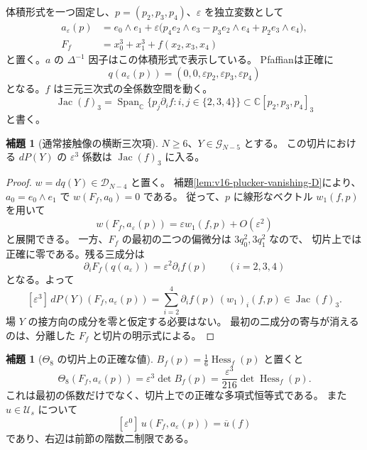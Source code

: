 \documentclass[a4paper,11pt]{ltjsarticle}
\theoremstyle{definition}
\newtheorem{lemma}[theorem]{補題}
\begin{document}
体積形式を一つ固定し、$p=(p_2,p_3,p_4)$、$\varepsilon$ を独立変数として
\begin{equation}\label{eq:v16-normal-slice}
 \begin{split}
 a_\varepsilon(p)&=e_0\wedge e_1+
 \varepsilon\bigl(p_4e_2\wedge e_3-p_3e_2\wedge e_4+p_2e_3\wedge e_4\bigr),\\
 F_f&=x_0^3+x_1^3+f(x_2,x_3,x_4)
 \end{split}
\end{equation}
と置く。$a$ の $\Delta^{-1}$ 因子はこの体積形式で表示している。
Pfaffianは正確に
\begin{equation}\label{eq:v16-normal-pfaffian}
 q(a_\varepsilon(p))=(0,0,\varepsilon p_2,\varepsilon p_3,\varepsilon p_4)
\end{equation}
となる。$f$ は三元三次式の全係数空間を動く。
\[
 \operatorname{Jac}(f)_3
 =\operatorname{Span}_{\mathbb C}
 \{p_j\partial_i f: i,j\in\{2,3,4\}\}
 \subset\mathbb C[p_2,p_3,p_4]_3
\]
と書く。

\begin{lemma}[通常接触像の横断三次項]
\label{lem:v16-contact-normal-cubic-jet}
$N\ge6$、$Y\in\mathcal G_{N-5}$ とする。
この切片における $dP(Y)$ の $\varepsilon^3$ 係数は
$\operatorname{Jac}(f)_3$ に入る。
\end{lemma}

\begin{proof}
$w=dq(Y)\in\mathcal D_{N-4}$ と置く。
補題\ref{lem:v16-plucker-vanishing-D}により、
$a_0=e_0\wedge e_1$ で $w(F_f,a_0)=0$ である。
従って、$p$ に線形なベクトル $w_1(f,p)$ を用いて
\[
 w(F_f,a_\varepsilon(p))=\varepsilon w_1(f,p)+O(\varepsilon^2)
\]
と展開できる。
一方、$F_f$ の最初の二つの偏微分は $3q_0^2,3q_1^2$ なので、
切片上では正確に零である。残る三成分は
\[
 \partial_iF_f(q(a_\varepsilon))=\varepsilon^2\partial_i f(p)
 \qquad(i=2,3,4)
\]
となる。よって
\[
 [\varepsilon^3]\,dP(Y)(F_f,a_\varepsilon(p))
   =\sum_{i=2}^4\partial_i f(p)\,(w_1)_i(f,p)
   \in\operatorname{Jac}(f)_3.
\]
場 $Y$ の接方向の成分を零と仮定する必要はない。
最初の二成分の寄与が消えるのは、分離した $F_f$ と切片の明示式による。
\end{proof}

\begin{lemma}[$\Theta_8$ の切片上の正確な値]
\label{lem:v16-theta-normal-hessian}
$B_f(p)=\tfrac16\operatorname{Hess}_f(p)$ と置くと
\begin{equation}\label{eq:v16-exact-theta-slice}
 \Theta_8(F_f,a_\varepsilon(p))
   =\varepsilon^3\det B_f(p)
   =\frac{\varepsilon^3}{216}\det\operatorname{Hess}_f(p).
\end{equation}
これは最初の係数だけでなく、切片上での正確な多項式恒等式である。
また $u\in\mathcal U_s$ について
\[
 [\varepsilon^0]\,u(F_f,a_\varepsilon(p))=\overline u(f)
\]
であり、右辺は前節の階数二制限である。
\end{lemma}
\end{document}
